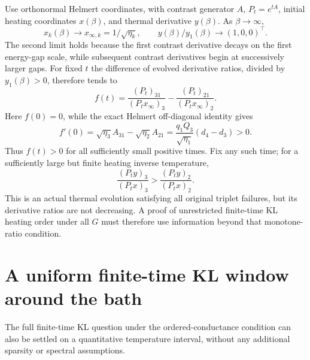 \documentclass[11pt]{article}
\begin{document}
Use orthonormal Helmert coordinates, with contrast generator $A$,
$P_t=e^{tA}$, initial heating coordinates $x(\beta)$, and thermal
derivative $y(\beta)$. As $\beta\to\infty$,
\[
x_k(\beta)\longrightarrow x_{\infty,k}=1/\sqrt{\eta_k},
\qquad y(\beta)/y_1(\beta)\longrightarrow(1,0,0)^\top.
\]
The second limit holds because the first contrast derivative decays
on the first energy-gap scale, while subsequent contrast derivatives
begin at successively larger gaps.
For fixed $t$ the difference of evolved derivative ratios, divided
by $y_1(\beta)>0$, therefore tends to
\[
f(t)=\frac{(P_t)_{31}}{(P_tx_\infty)_3}
     -\frac{(P_t)_{21}}{(P_tx_\infty)_2}.
\]
Here $f(0)=0$, while the exact Helmert off-diagonal identity gives
\[
f'(0)=\sqrt{\eta_3}A_{31}-\sqrt{\eta_2}A_{21}
=\frac{q_1Q_3}{\sqrt{\eta_1}}(d_4-d_3)>0.
\]
Thus $f(t)>0$ for all sufficiently small positive times. Fix any such
time; for a sufficiently large but finite heating inverse temperature,
\[
\frac{(P_ty)_3}{(P_tx)_3}>
\frac{(P_ty)_2}{(P_tx)_2}.
\]
This is an actual thermal evolution satisfying all original triplet
failures, but its derivative ratios are not decreasing. A proof of
unrestricted finite-time KL heating order under all $G$ must therefore
use information beyond that monotone-ratio condition.

\section{A uniform finite-time KL window around the bath}
\label{sec:nearbatheentropy}
The full finite-time KL question under the ordered-conductance condition
can also be settled on a quantitative temperature interval, without
any additional sparsity or spectral assumptions.
\end{document}
